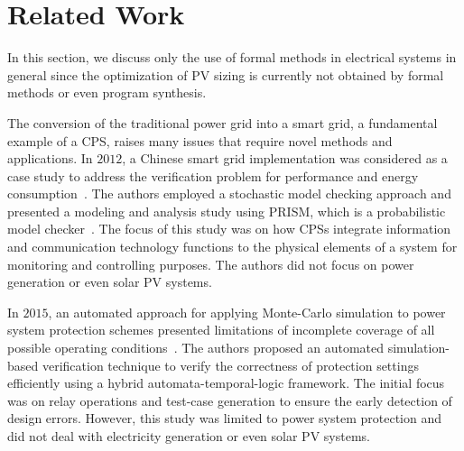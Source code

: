  
\section{Related Work}

In this section, we discuss only the use of formal methods in electrical systems in general since the optimization of PV sizing is currently not obtained by formal methods or even program synthesis. %

The conversion of the traditional power grid into a smart grid, a fundamental example of a CPS, raises many issues that require novel methods and applications. In $2012$, a Chinese smart grid implementation was considered as a case study to address the verification problem for performance and energy consumption~\cite{Yukseletall2012}. The authors employed a stochastic model checking approach and presented a modeling and analysis study using PRISM, which is a probabilistic model checker~\cite{KwiatkowskaNP11}. The focus of this study was on how CPSs integrate information and communication technology functions to the physical elements of a system for monitoring and controlling purposes. The authors did not focus on power generation or even solar PV systems.

In $2015$, an automated approach for applying Monte-Carlo simulation to power system protection schemes presented limitations of incomplete coverage of all possible operating conditions~\cite{Sengupta2015}. The authors proposed an automated simulation-based verification technique to verify the correctness of protection settings efficiently using a hybrid automata-temporal-logic framework. The initial focus was on relay operations and test-case generation to ensure the early detection of design errors. However, this study was limited to power system protection and did not deal with electricity generation or even solar PV systems.

